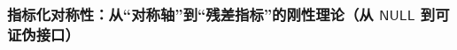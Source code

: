 \subsubsection{指标化对称性：从“对称轴”到“残差指标”的刚性理论（从 \texorpdfstring{$\mathsf{NULL}$}{NULL} 到可证伪接口）}\label{subsec:xi-certificate-coherence-orthogonal-axis-capacity}




\endinput
